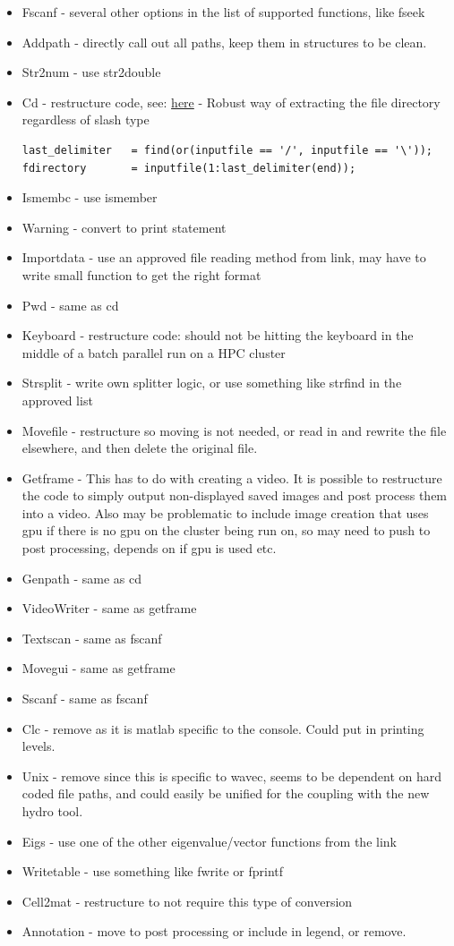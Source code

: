 \documentclass{article}
\begin{document}
\begin{itemize}

\item Fscanf - several other options in the list of supported functions, like fseek
\item Addpath - directly call out all paths, keep them in structures to be clean.
\item Str2num - use str2double
\item Cd - restructure code, see: \href{https://www.mathworks.com/help/compiler_sdk/ml_code/writing-deployable-matlab-code.html}{here}
\subitem - Robust way of extracting the file directory regardless of slash type
\begin{verbatim}
last_delimiter   = find(or(inputfile == '/', inputfile == '\'));
fdirectory       = inputfile(1:last_delimiter(end));
 \end{verbatim}
\item Ismembc - use ismember
\item Warning - convert to print statement
\item Importdata - use an approved file reading method from link, may have to write small function to get the right format
\item Pwd - same as cd
\item Keyboard - restructure code: should not be hitting the keyboard in the middle of a batch parallel run on a HPC cluster
\item Strsplit - write own splitter logic, or use something like strfind in the approved list
\item Movefile - restructure so moving is not needed, or read in and rewrite the file elsewhere, and then delete the original file.
\item Getframe - This has to do with creating a video. It is possible to restructure the code to simply output non-displayed saved images and post process them into a video. Also may be problematic to include image creation that uses gpu if there is no gpu on the cluster being run on, so may need to push to post processing, depends on if gpu is used etc.
\item Genpath - same as cd
\item VideoWriter - same as getframe
\item Textscan - same as fscanf
\item Movegui - same as getframe
\item Sscanf - same as fscanf
\item Clc - remove as it is matlab specific to the console. Could put in printing levels.
\item Unix - remove since this is specific to wavec, seems to be dependent on hard coded file paths, and could easily be unified for the coupling with the new hydro tool.
\item Eigs - use one of the other eigenvalue/vector functions from the link
\item Writetable - use something like fwrite or fprintf
\item Cell2mat - restructure to not require this type of conversion
\item Annotation - move to post processing or include in legend, or remove.


\end{itemize}
\end{document}
